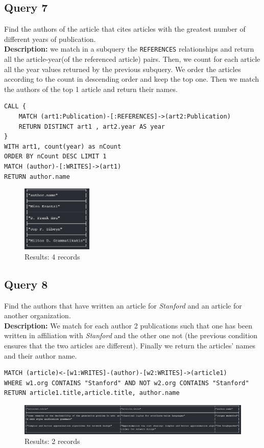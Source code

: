 \documentclass{Configuration_Files/PoliMi3i_thesis}
\begin{document}
\subsection{Query 7}
Find the authors of the article that cites articles with the greatest number of different years of publication.\\
\textbf{Description:} we match in a subquery the \verb |REFERENCES| relationships and return all the article-year(of the
referenced article) pairs. Then, we count for each article all the year values returned by the previous subquery. We
order the articles according to the count in descending order and keep the top one. Then we match the authors of the top
1 article and return their names.
\begin{lstlisting}[language=cypher, label=lst:cypher-example]
CALL {
    MATCH (art1:Publication)-[:REFERENCES]->(art2:Publication)
    RETURN DISTINCT art1 , art2.year AS year
}
WITH art1, count(year) as nCount
ORDER BY nCount DESC LIMIT 1
MATCH (author)-[:WRITES]->(art1)
RETURN author.name
\end{lstlisting}
\begin{figure}[H]
\centering
\includegraphics[width=0.3\textwidth]{query/query7.PNG}
\caption{Results: 4 records}
\label{fig:query7}
\end{figure}

\subsection{Query 8}
Find the authors that have written an article for \emph{Stanford} and an article for another organization.\\
\textbf{Description:} We match for each author 2 publications such that one has been written in affiliation with \emph{Stanford}
and the other one not (the previous condition ensures that the two articles are different). Finally we return the articles'
names and their author name.
\begin{lstlisting}[language=cypher, label=lst:cypher-example]
MATCH (article)<-[w1:WRITES]-(author)-[w2:WRITES]->(article1)
WHERE w1.org CONTAINS "Stanford" AND NOT w2.org CONTAINS "Stanford"
RETURN article1.title,article.title, author.name
\end{lstlisting}
\begin{figure}[H]
\centering
\includegraphics[width=1\textwidth]{query/query8.PNG}
\caption{Results: 2 records}
\label{fig:query8}
\end{figure}
\end{document}
